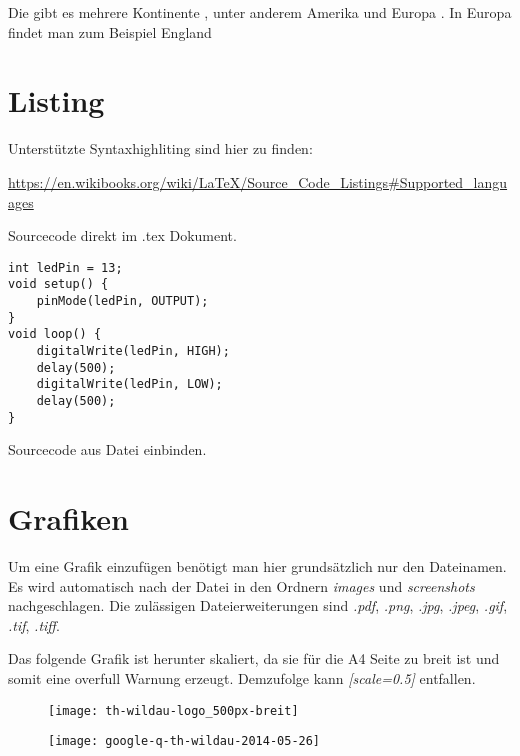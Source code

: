 Die  gibt es 
mehrere Kontinente , 
unter anderem Amerika 
 und 
Europa . 
In Europa findet man zum Beispiel 
England 

\section{Listing}\label{sec:listing}

Unterstützte Syntaxhighliting sind hier zu finden: \\
\begin{footnotesize}
	\url{https://en.wikibooks.org/wiki/LaTeX/Source_Code_Listings#Supported_languages}
\end{footnotesize}
\par

Sourcecode direkt im .tex Dokument.\par

\lstset{language=C} %
\begin{lstlisting}[caption=Arduino Beispielprogramm, label=lst:arduino]
int ledPin = 13;
void setup() {
    pinMode(ledPin, OUTPUT);
}
void loop() {
    digitalWrite(ledPin, HIGH);
    delay(500);
    digitalWrite(ledPin, LOW);
    delay(500);
}
\end{lstlisting}

Sourcecode aus Datei einbinden.\par



\section{Grafiken}\label{sec:grafiken}

Um eine Grafik einzufügen benötigt man hier grundsätzlich nur den Dateinamen. Es wird automatisch nach der Datei in den Ordnern \textit{images} und \textit{screenshots} nachgeschlagen. Die zulässigen Dateierweiterungen sind \textit{.pdf}, \textit{.png}, \textit{.jpg}, \textit{.jpeg}, \textit{.gif}, \textit{.tif}, \textit{.tiff}.\par

Das folgende Grafik ist herunter skaliert, da sie für die A4 Seite zu breit ist und somit eine overfull Warnung erzeugt. Demzufolge kann \textit{[scale=0.5]} entfallen.\par

\begin{figure}[ht]
	\centering
	\texttt{[image: th-wildau-logo\_500px-breit]}
	\label{fig:thWildau050}
\end{figure}

\begin{figure}[ht]
	\centering
	\texttt{[image: google-q-th-wildau-2014-05-26]}
	\label{fig:googleThWildau}
\end{figure}
